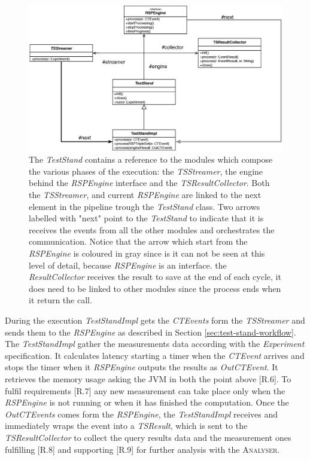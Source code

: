 \begin{figure}[tbh]
  \centering
	\includegraphics[width=0.90\linewidth]{images/uml_teststand_modules}
	\caption[UML Schema: \name \textsc{TestStand} and modules] { The \textit{TestStand} contains a reference to the modules which compose the various phases of the execution: the \textit{TSStreamer}, the engine behind the \textit{RSPEngine} interface and the \textit{TSResultCollector}. Both the \textit{TSStreamer}, and current \textit{RSPEngine} are linked to the next element in the pipeline trough the \textit{TestStand} class. Two arrows labelled with "next"  point to the  \textit{TestStand} to indicate that it is receives the events from all the other modules and orchestrates the communication. Notice that the arrow which start from the \textit{RSPEngine} is coloured in gray since is it can not be seen at this level of detail, because \textit{RSPEngine} is an interface.  the \textit{ResultCollector} receives the result to save at the end of each cycle, it does need to be linked to other modules since the process ends when it return the call.} 
  	\label{fig:uml_teststand_modules}
\end{figure}

During the execution \textit{TestStandImpl} gets the \textit{CTEvents} form the \textit{TSStreamer} and sends them to the \textit{RSPEngine} as described in Section \ref{sec:test-stand-workflow}. The \textit{TestStandImpl} gather the measurements data according with the \textit{Experiment} specification. It calculates latency starting a timer when the \textit{CTEvent} arrives and stops the timer when it \textit{RSPEngine} outputs the results as \textit{OutCTEvent}. It retrieves the memory usage asking the JVM in both the point above [R.6]. To fulfil requirements [R.7] any new measurement can take place only when the \textit{RSPEngine} is not running or when it has finished the computation. Once the \textit{OutCTEvents} comes form the \textit{RSPEngine}, the \textit{TestStandImpl} receives and immediately wraps the event into a \textit{TSResult}, which is sent to the \textit{TSResultCollector} to collect the query results data and the measurement ones fulfilling [R.8] and supporting [R.9] for further analysis with the \textsc{Analyser}.
%

